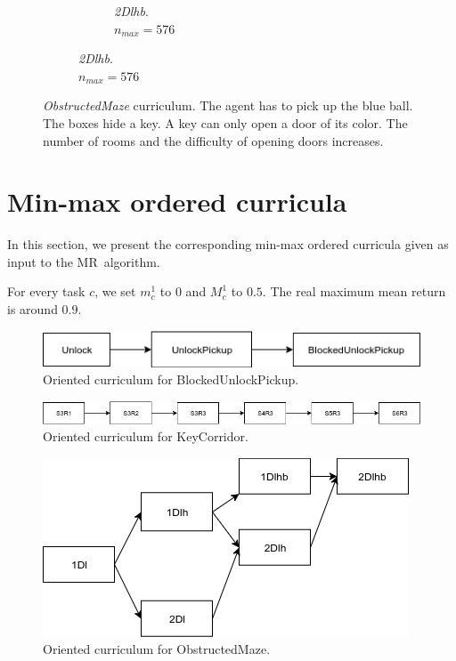 \documentclass{article}
\begin{document}
\begin{figure}[H]
\begin{subfigure}[b]{0.6\linewidth}
\begin{subfigure}[b]{0.32\linewidth}
    \caption{\textit{2Dlhb}. \\
    \(n_{max}=576\)}
  \end{subfigure}
  \end{subfigure}
  \caption{\textit{ObstructedMaze} curriculum. The agent has to pick up the blue ball. The boxes hide a key. A key can only open a door of its color. The number of rooms and the difficulty of opening doors increases.}
\label{fig:obstructedmaze}
\end{figure}

\section{Min-max ordered curricula}\label{app:ordered-curricula}

In this section, we present the corresponding min-max ordered curricula given as input to the MR\ algorithm.

For every task \(c\), we set \(m_c^1\) to \(0\) and \(M_c^1\) to \(0.5\). The real maximum mean return is around \(0.9\).%

\begin{figure}[H]
\centering
\includegraphics[width=0.67\linewidth]{Curriculums/BlockedUnlockPickup}
\caption{Oriented curriculum for BlockedUnlockPickup.}
\end{figure}

\begin{figure}[H]
\centering
\includegraphics[width=\linewidth]{Curriculums/KeyCorridor}
\caption{Oriented curriculum for KeyCorridor.}
\end{figure}

\begin{figure}[H]
\centering
\includegraphics[width=.6\linewidth]{Curriculums/ObstructedMaze}
\caption{Oriented curriculum for ObstructedMaze.}
\end{figure}
\end{document}
